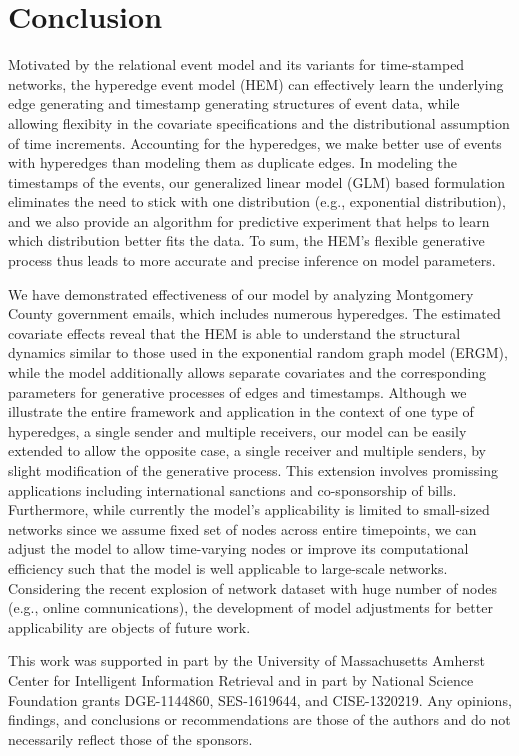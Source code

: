 \documentclass[ba]{imsart}
\numberwithin{equation}{section}
\theoremstyle{plain}
\begin{document}
\section{Conclusion}\label{sec:conclusion}
Motivated by the relational event model \citep{Butts2008} and its variants for time-stamped networks, the hyperedge event model (HEM) can effectively learn the underlying edge generating and timestamp generating structures of event data, while allowing flexibity in the covariate specifications and the distributional assumption of time increments.
Accounting for the hyperedges, we make better use of events with hyperedges than modeling them as duplicate edges. In modeling the timestamps of the events, our generalized linear model (GLM) based formulation eliminates the need to stick with one distribution (e.g., exponential distribution), and we also provide an algorithm for predictive experiment that helps to learn which distribution better fits the data. To sum, the HEM's flexible generative process thus leads to more accurate and precise inference on model parameters.

We have demonstrated effectiveness of our model by analyzing Montgomery County government emails, which includes numerous hyperedges. The estimated covariate effects reveal that the HEM is able to understand the structural dynamics similar to those used in the exponential random graph model (ERGM), while the model additionally allows separate covariates and the corresponding parameters for generative processes of edges and timestamps. Although we illustrate the entire framework and application in the context
of one type of hyperedges, a single sender and multiple receivers, our model can be easily extended to allow the opposite case, a single receiver and multiple senders, by slight modification of the generative process. This extension involves promissing applications including international sanctions and co-sponsorship of bills. Furthermore, while currently the model's applicability is limited to small-sized networks since we assume fixed set of nodes across entire timepoints, we can adjust the model to allow time-varying nodes or improve its computational efficiency such that the model is well applicable to large-scale networks. Considering the recent explosion of network dataset with huge number of nodes (e.g., online comnunications), the development of model adjustments for better applicability are objects of future work.

\begin{acknowledgement}
	This work was supported in part by the University of Massachusetts Amherst Center for Intelligent Information Retrieval and in part by National Science Foundation grants DGE-1144860, SES-1619644, and CISE-1320219. Any opinions, findings, and conclusions or recommendations are those of the authors and do not necessarily reflect those of the
	sponsors.
\end{acknowledgement}
\end{document}

